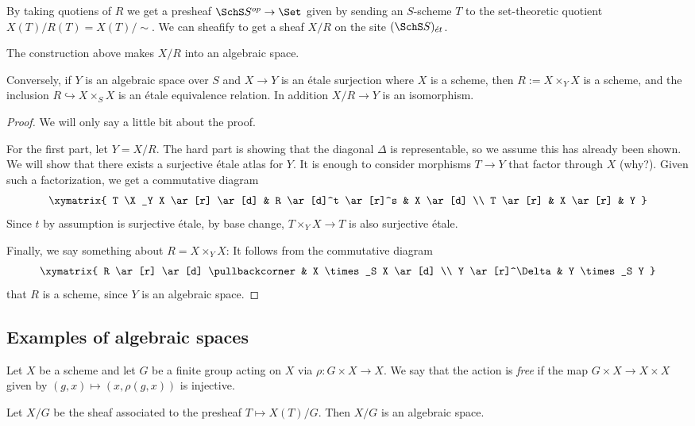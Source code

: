 \documentclass[11pt, english]{article}
\begin{document}
By taking quotiens of $R$ we get a presheaf $\SchS S ^{op} \to \Set$ given by sending an $S$-scheme $T$ to the set-theoretic quotient $X(T)/R(T)=X(T)/\sim$. We can sheafify to get a sheaf $X/R$ on the site $(\SchS S)_{\acute et}$.

\begin{prop}

The construction above makes $X/R$ into an algebraic space.  

Conversely, if $Y$ is an algebraic space over $S$ and $X \to Y$ is an étale surjection where $X$ is a scheme, then $R:= X \times_Y X$ is a scheme, and the inclusion $R \hookrightarrow X \times_S X$ is an étale equivalence relation. In addition $X/R \to Y$ is an isomorphism.
\end{prop}
\begin{proof}
We will only say a little bit about the proof.

For the first part, let $Y=X/R$. The hard part is showing that the diagonal $\Delta$ is representable, so we assume this has already been shown. We will show that there exists a surjective étale atlas for $Y$. It is enough to consider morphisms $T \to Y$ that factor through $X$ (why?). Given such a factorization, we get a commutative diagram
\[
\xymatrix{
T \X_Y X \ar[r] \ar[d] & R \ar[d]^t \ar[r]^s & X \ar[d] \\
T \ar[r] & X \ar[r] & Y
}
\]
Since $t$ by assumption is surjective étale, by base change, $T \times_Y X \to T$ is also surjective étale.

Finally, we say something about $R = X \times_Y X$: It follows from the commutative diagram
\[
\xymatrix{
R \ar[r] \ar[d] \pullbackcorner & X \times_S X \ar[d] \\
Y \ar[r]^\Delta & Y \times_S Y
}
\]
that $R$ is a scheme, since $Y$ is an algebraic space.
\end{proof}

\subsection{Examples of algebraic spaces}

\begin{example}
Let $X$ be a scheme and let $G$ be a finite group acting on $X$ via $\rho:G \times X \to X$. We say that the action is \emph{free} if the map $G \times X \to X \times X$ given by $(g,x) \mapsto (x,\rho(g,x))$ is injective.

Let $X/G$ be the sheaf associated to the presheaf $T \mapsto X(T)/G$. Then $X/G$ is an algebraic space.
\end{example}
\end{document}

